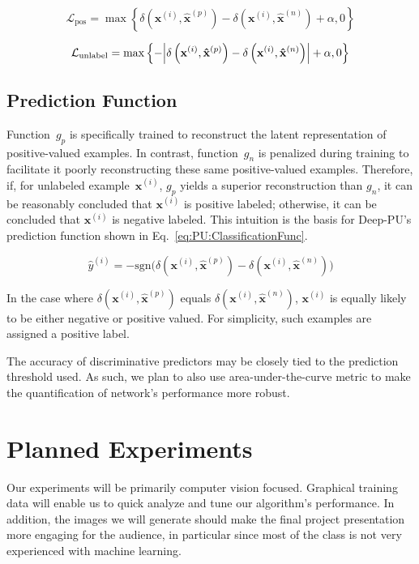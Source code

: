 \documentclass[10pt]{article}
\newcommand{\sign}[1]{\text{sgn}\bigg( #1 \bigg) }
\DeclarePairedDelimiter{\abs}{\lvert}{\rvert}
\newcommand{\toolname}{Deep-PU}
\newcommand{\xI}[1]{\mathbf{x}^{(#1)}}
\newcommand{\xPred}[1]{\mathbf{\hat{x}}^{\left(#1\right)}}
\newcommand{\xP}{\xPred{p}}
\newcommand{\xN}{\xPred{n}}
\newcommand{\puDist}[2]{\delta\left(#1, #2\right)}
\newcommand{\puDistDiff}{\puDist{\xI{i}}{\xP} - \puDist{\xI{i}}{\xN}}
\newcommand{\pLoss}{\mathcal{L}_{\text{pos}}}
\newcommand{\uLoss}{\mathcal{L}_{\text{unlabel}}}
\begin{document}
  \begin{equation}\label{eq:PU:PosLoss}
    \pLoss = \max\left\{ \puDistDiff + \alpha, 0 \right\}
  \end{equation}

  \begin{equation}\label{eq:PU:UnlabelLoss}
    \uLoss = \max\left\{ - \abs*{\puDistDiff} + \alpha, 0 \right\}
  \end{equation}

\subsection{Prediction Function}

Function~$g_{p}$ is specifically trained to reconstruct the latent representation of positive-valued examples.  In contrast, function~$g_{n}$ is penalized during training to facilitate it poorly reconstructing these same positive-valued examples.  Therefore, if, for unlabeled example~$\xI{i}$, $g_{p}$ yields a superior reconstruction than $g_{n}$, it can be reasonably concluded that $\xI{i}$ is positive labeled; otherwise, it can be concluded that $\xI{i}$ is negative labeled.  This intuition is the basis for \toolname's prediction function shown in Eq.~\eqref{eq:PU:ClassificationFunc}.

  \begin{equation}\label{eq:PU:ClassificationFunc}
    \hat{y}^{\left( i \right)} = -\sign{\puDistDiff}
  \end{equation}

\noindent
In the case where $\puDist{\xI{i}}{\xP}$ equals $\puDist{\xI{i}}{\xN}$, $\xI{i}$ is equally likely to be either negative or positive valued.  For simplicity, such examples are assigned a positive label. %

  The accuracy of discriminative predictors may be closely tied to the prediction threshold used.  As such, we plan to also use area-under-the-curve metric to make the quantification of network's performance more robust.

\section{Planned Experiments}\label{sec:Experiments}

Our experiments will be primarily computer vision focused. Graphical training data will enable us to quick analyze and tune our algorithm's performance.  In addition, the images we will generate should make the final project presentation more engaging for the audience, in particular since most of the class is not very experienced with machine learning.
\end{document}
